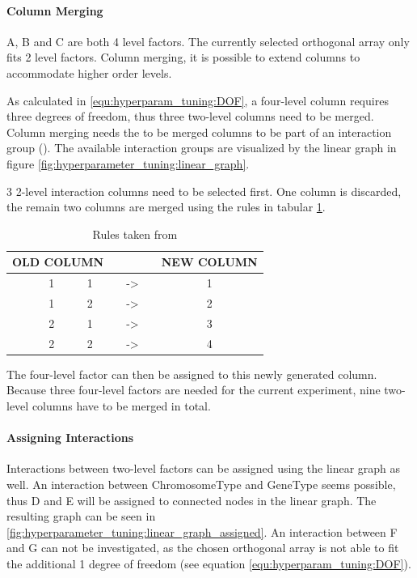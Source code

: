 \paragraph{Column Merging}
A, B and C are both 4 level factors. The currently selected orthogonal array only fits 2 level factors. Column merging, it is possible to extend columns to accommodate higher order levels. 

As calculated in \ref{equ:hyperparam_tuning:DOF}, a four-level column requires three degrees of freedom, thus three two-level columns need to be merged. Column merging needs the to be merged columns to be part of an interaction group (\cite{yang_design_2009}). The available interaction groups are visualized by the linear graph in figure \ref{fig:hyperparameter_tuning:linear_graph}.

3 2-level interaction columns need to be selected first. One column is discarded, the remain two columns are merged using the rules in tabular \ref{tab:hyperparameter_tuning:merging_rules}.

\begin{table}[ht]
	\centering
	\begin{tabular}{ |ccccccc|  }
		\hline
		\multicolumn{3}{|c}{ OLD COLUMN } & & & & NEW COLUMN \\
		\hline
		& 1 & 1 & & -> & & 1\\
		& 1 & 2 & & -> & & 2\\
		& 2 & 1 & & -> & & 3\\
		& 2 & 2 & & -> & & 4\\
		\hline
	\end{tabular}
	\caption{Rules taken from \cite{roy_primer_1990}}
	\label{tab:hyperparameter_tuning:merging_rules}
\end{table}

The four-level factor can then be assigned to this newly generated column. Because three four-level factors are needed for the current experiment, nine two-level columns have to be merged in total.

\paragraph{Assigning Interactions}
Interactions between two-level factors can be assigned using the linear graph as well. An interaction between ChromosomeType and GeneType seems possible, thus D and E will be assigned to connected nodes in the linear graph. The resulting graph can be seen in \ref{fig:hyperparameter_tuning:linear_graph_assigned}. An interaction between F and G can not be investigated, as the chosen orthogonal array is not able to fit the additional 1 degree of freedom (see equation \ref{equ:hyperparam_tuning:DOF}).

